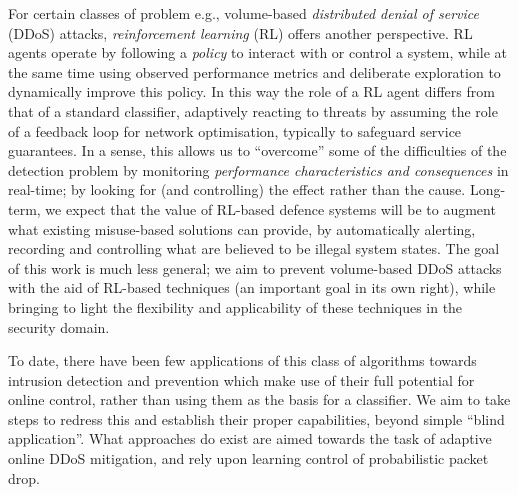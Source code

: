 \documentclass[10pt, times, comsoc]{IEEEtran}
\begin{document}
For certain classes of problem e.g., volume-based \emph{distributed denial of service} (DDoS) attacks, \emph{reinforcement learning} (RL) offers another perspective.
RL agents operate by following a \emph{policy} to interact with or control a system, while at the same time using observed performance metrics and deliberate exploration to dynamically improve this policy.
In this way the role of a RL agent differs from that of a standard classifier, adaptively reacting to threats by assuming the role of a feedback loop for network optimisation, typically to safeguard service guarantees.
In a sense, this allows us to ``overcome'' some of the difficulties of the detection problem by monitoring \emph{performance characteristics and consequences} in real-time; by looking for (and controlling) the effect rather than the cause.
Long-term, we expect that the value of RL-based defence systems will be to augment what existing misuse-based solutions can provide, by automatically alerting, recording and controlling what are believed to be illegal system states.
The goal of this work is much less general; we aim to prevent volume-based DDoS attacks with the aid of RL-based techniques (an important goal in its own right), while bringing to light the flexibility and applicability of these techniques in the security domain.

To date, there have been few applications of this class of algorithms towards intrusion detection and prevention which make use of their full potential for online control, rather than using them as the basis for a classifier.
We aim to take steps to redress this and establish their proper capabilities, beyond simple ``blind application''.
What approaches do exist are aimed towards the task of adaptive online DDoS mitigation, and rely upon learning control of probabilistic packet drop.
\end{document}
